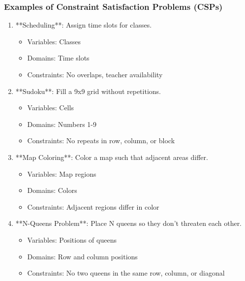 \documentclass[aspectratio=169]{beamer}
\begin{document}
\begin{frame}[fragile]
    \frametitle{Examples of Constraint Satisfaction Problems (CSPs)}
    \begin{enumerate}
        \item **Scheduling**: Assign time slots for classes.
            \begin{itemize}
                \item Variables: Classes
                \item Domains: Time slots
                \item Constraints: No overlaps, teacher availability
            \end{itemize}
        \item **Sudoku**: Fill a 9x9 grid without repetitions.
            \begin{itemize}
                \item Variables: Cells
                \item Domains: Numbers 1-9
                \item Constraints: No repeats in row, column, or block
            \end{itemize}
        \item **Map Coloring**: Color a map such that adjacent areas differ.
            \begin{itemize}
                \item Variables: Map regions
                \item Domains: Colors
                \item Constraints: Adjacent regions differ in color
            \end{itemize}
        \item **N-Queens Problem**: Place N queens so they don’t threaten each other.
            \begin{itemize}
                \item Variables: Positions of queens
                \item Domains: Row and column positions
                \item Constraints: No two queens in the same row, column, or diagonal
            \end{itemize}
    \end{enumerate}
\end{frame}
\end{document}
